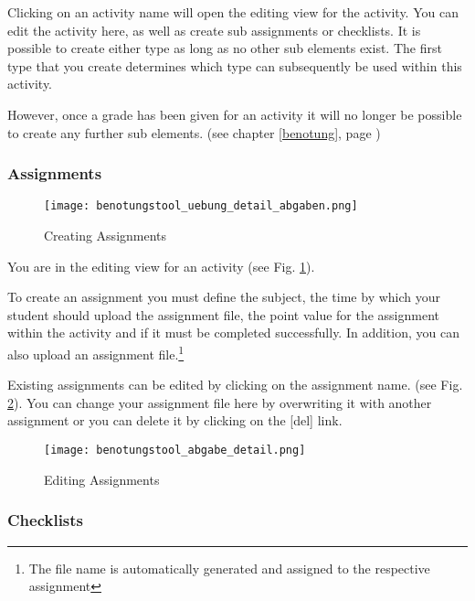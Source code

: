 Clicking on an activity name will open the editing view for the activity. You can edit the activity here, as well as create sub assignments or checklists. It is possible to create either type as long as no other sub elements exist. The first type that you create determines which type can subsequently be used within this activity.

However, once a grade has been given for an activity it will no longer be possible to create any further sub elements. (see chapter \ref{benotung}, page \pageref{benotung}) 

\subsubsection{Assignments}

\begin{figure}[ht]
\begin{center}
\texttt{[image: benotungstool\_uebung\_detail\_abgaben.png]}
\end{center}
\caption{Creating Assignments}\label{uebung_detail_abgaben}
\end{figure}

You are in the editing view for an activity (see Fig. \ref{uebung_detail_abgaben}).

To create an assignment you must define the subject, the time by which your student should upload the assignment file, the point value for the assignment within the activity and if it must be completed successfully. In addition, you can also upload an assignment file.\footnote{The file name is automatically generated and assigned to the respective assignment}

Existing assignments can be edited by clicking on the assignment name. (see Fig. \ref{abgabe_detail}). You can change your assignment file here by overwriting it with another assignment or you can delete it by clicking on the [del] link.

\begin{figure}[ht]
\begin{center}
\texttt{[image: benotungstool\_abgabe\_detail.png]}
\end{center}
\caption{Editing Assignments}\label{abgabe_detail}
\end{figure}

\subsubsection{Checklists}
\label{kap_kreuzerllisten}

